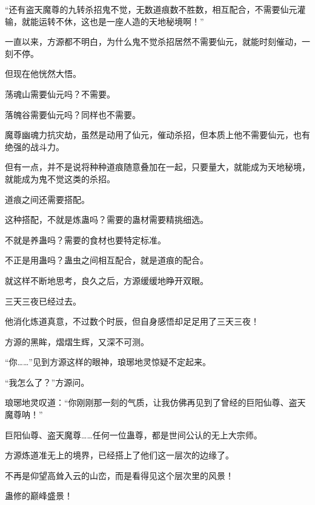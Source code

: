 \begin{this_body}
“还有盗天魔尊的九转杀招鬼不觉，无数道痕数不胜数，相互配合，不需要仙元灌输，就能运转不休，这也是一座人造的天地秘境啊！”

一直以来，方源都不明白，为什么鬼不觉杀招居然不需要仙元，就能时刻催动，一刻不停。

但现在他恍然大悟。

荡魂山需要仙元吗？不需要。

落魄谷需要仙元吗？同样也不需要。

魔尊幽魂力抗灾劫，虽然是动用了仙元，催动杀招，但本质上他不需要仙元，也有绝强的战斗力。

但有一点，并不是说将种种道痕随意叠加在一起，只要量大，就能成为天地秘境，就能成为鬼不觉这类的杀招。

道痕之间还需要搭配。

这种搭配，不就是炼蛊吗？需要的蛊材需要精挑细选。

不就是养蛊吗？需要的食材也要特定标准。

不正是用蛊吗？蛊虫之间相互配合，就是道痕的配合。

就这样不断地思考，良久之后，方源缓缓地睁开双眼。

三天三夜已经过去。

他消化炼道真意，不过数个时辰，但自身感悟却足足用了三天三夜！

方源的黑眸，熠熠生辉，又深不可测。

“你……”见到方源这样的眼神，琅琊地灵惊疑不定起来。

“我怎么了？”方源问。

琅琊地灵叹道：“你刚刚那一刻的气质，让我仿佛再见到了曾经的巨阳仙尊、盗天魔尊呐！”

巨阳仙尊、盗天魔尊……任何一位蛊尊，都是世间公认的无上大宗师。

方源炼道准无上的境界，已经搭上了他们这一层次的边缘了。

不再是仰望高耸入云的山峦，而是看得见这个层次里的风景！

蛊修的巅峰盛景！

\end{this_body}

